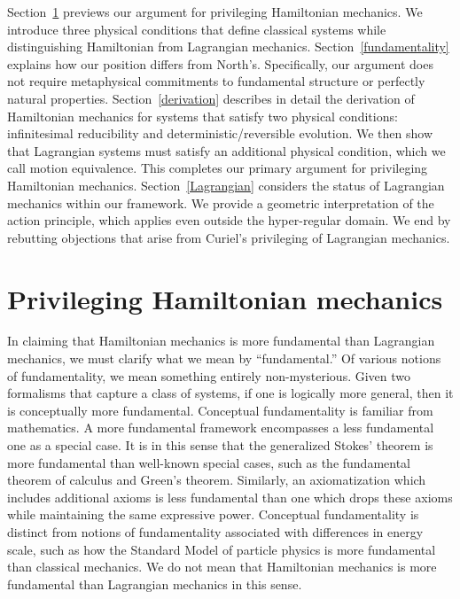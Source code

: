 \documentclass[12pt, twoside]{article}
\begin{document}
Section~\ref{privileging} previews our argument for privileging Hamiltonian mechanics. We introduce three physical conditions that define classical systems while distinguishing Hamiltonian from Lagrangian mechanics. Section~\ref{fundamentality} explains how our position differs from North's. Specifically, our argument does not require metaphysical commitments to fundamental structure or perfectly natural properties. Section~\ref{derivation} describes in detail the derivation of Hamiltonian mechanics for systems that satisfy two physical conditions: infinitesimal reducibility and deterministic/reversible evolution. We then show that Lagrangian systems must satisfy an additional physical condition, which we call motion equivalence. This completes our primary argument for privileging Hamiltonian mechanics. Section~\ref{Lagrangian} considers the status of Lagrangian mechanics within our framework. We provide a geometric interpretation of the action principle, which applies even outside the hyper-regular domain. We end by rebutting objections that arise from Curiel's \parencites*[]{Curiel} privileging of Lagrangian mechanics. 




\section{Privileging Hamiltonian mechanics}
\label{privileging}

In claiming that Hamiltonian mechanics is more fundamental than Lagrangian mechanics, we must clarify what we mean by ``fundamental.'' Of various notions of fundamentality, we mean something entirely non-mysterious. Given two formalisms that capture a class of systems, if one is logically more general, then it is conceptually more fundamental. Conceptual fundamentality is familiar from mathematics. A more fundamental framework encompasses a less fundamental one as a special case. It is in this sense that the generalized Stokes' theorem is more fundamental than well-known special cases, such as the fundamental theorem of calculus and Green's theorem. Similarly, an axiomatization which includes additional axioms is less fundamental than one which drops these axioms while maintaining the same expressive power. Conceptual fundamentality is distinct from notions of fundamentality associated with differences in energy scale, such as how the Standard Model of particle physics is more fundamental than classical mechanics. We do not mean that Hamiltonian mechanics is more fundamental than Lagrangian mechanics in this sense.
\end{document}
